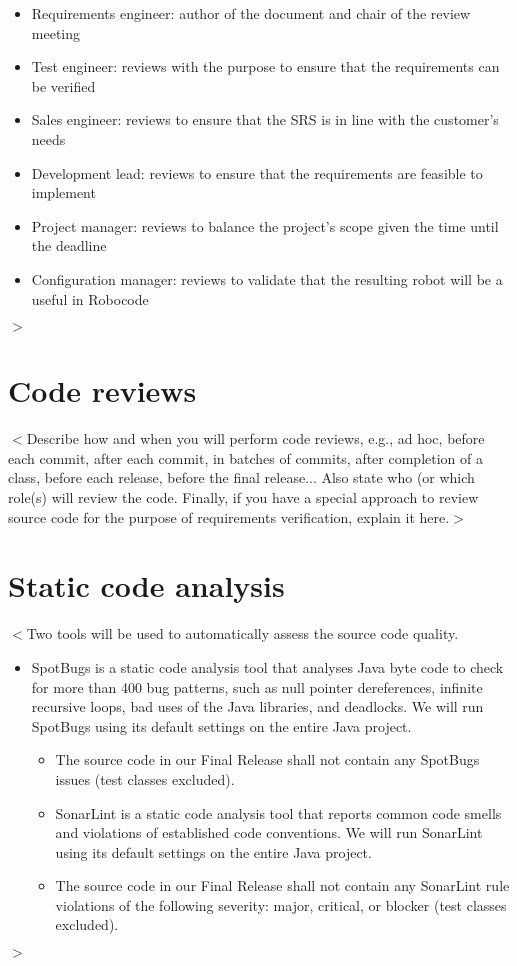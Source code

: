 \documentclass{scrreprt}
\begin{document}
\begin{itemize}
\item Requirements engineer: author of the document and chair of the review meeting
\item Test engineer: reviews with the purpose to ensure that the requirements can be verified
\item Sales engineer: reviews to ensure that the SRS is in line with the customer's needs
\item Development lead: reviews to ensure that the requirements are feasible to implement
\item Project manager: reviews to balance the project's scope given the time until the deadline
\item Configuration manager: reviews to validate that the resulting robot will be a useful in Robocode
\end{itemize}
$>$

\section{Code reviews}
$<$Describe how and when you will perform code reviews, e.g., ad hoc, before each commit, after each commit, in batches of commits, after completion of a class, before each release, before the final release... Also state who (or which role(s) will review the code. Finally, if you have a special approach to review source code for the purpose of requirements verification, explain it here.$>$

\section{Static code analysis}
$<$Two tools will be used to automatically assess the source code quality.
\begin{itemize}
\item SpotBugs is a static code analysis tool that analyses Java byte code to check for more than 400 bug patterns, such as null pointer dereferences, infinite recursive loops, bad uses of the Java libraries, and deadlocks. We will run SpotBugs using its default settings on the entire Java project.
\begin{itemize}
\item The source code in our Final Release shall not contain any SpotBugs issues (test classes excluded).
\end{itemize}
\begin{itemize}
\item SonarLint is a static code analysis tool that reports common code smells and violations of established code conventions. We will run SonarLint using its default settings on the entire Java project.
\end{itemize}
\begin{itemize}
\item The source code in our Final Release shall not contain any SonarLint rule violations of the following severity: major, critical, or blocker (test classes excluded).
\end{itemize}
\end{itemize}
$>$
\end{document}
